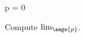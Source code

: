 \documentclass{ximera}
\author{Jim Fowler}
\begin{document}
\begin{sagesilent}
  p = 0
\end{sagesilent}

\begin{exercise}

  Compute $\lim_{\sage{p}}$.


  
\end{exercise}
\end{document}
